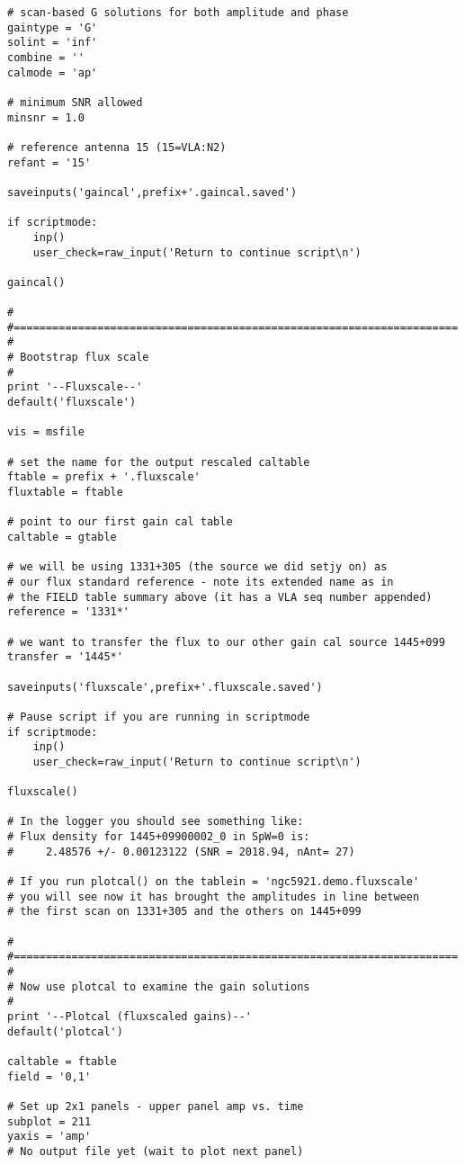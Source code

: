 \begin{verbatim}
# scan-based G solutions for both amplitude and phase
gaintype = 'G'
solint = 'inf'
combine = ''
calmode = 'ap'

# minimum SNR allowed
minsnr = 1.0

# reference antenna 15 (15=VLA:N2)
refant = '15'

saveinputs('gaincal',prefix+'.gaincal.saved')

if scriptmode:
    inp()
    user_check=raw_input('Return to continue script\n')

gaincal()

#
#=====================================================================
#
# Bootstrap flux scale
#
print '--Fluxscale--'
default('fluxscale')

vis = msfile

# set the name for the output rescaled caltable
ftable = prefix + '.fluxscale'
fluxtable = ftable

# point to our first gain cal table
caltable = gtable

# we will be using 1331+305 (the source we did setjy on) as
# our flux standard reference - note its extended name as in
# the FIELD table summary above (it has a VLA seq number appended)
reference = '1331*'

# we want to transfer the flux to our other gain cal source 1445+099
transfer = '1445*'

saveinputs('fluxscale',prefix+'.fluxscale.saved')

# Pause script if you are running in scriptmode
if scriptmode:
    inp()
    user_check=raw_input('Return to continue script\n')

fluxscale()

# In the logger you should see something like:
# Flux density for 1445+09900002_0 in SpW=0 is:
#     2.48576 +/- 0.00123122 (SNR = 2018.94, nAnt= 27)

# If you run plotcal() on the tablein = 'ngc5921.demo.fluxscale'
# you will see now it has brought the amplitudes in line between
# the first scan on 1331+305 and the others on 1445+099

#
#=====================================================================
#
# Now use plotcal to examine the gain solutions
#
print '--Plotcal (fluxscaled gains)--'
default('plotcal')

caltable = ftable
field = '0,1'

# Set up 2x1 panels - upper panel amp vs. time
subplot = 211
yaxis = 'amp'
# No output file yet (wait to plot next panel)


\end{verbatim}
